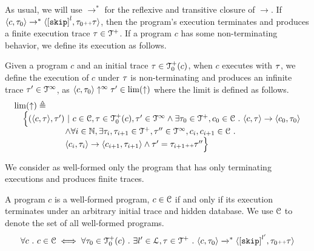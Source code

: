  As usual, we will use $\to^*$ for the reflexive and transitive closure of $\to$. 
 If $\config{c, \trace_0} \rightarrow^{*} \config{\clabel{\eskip}^l, \trace_0 \tracecat \trace}$,
 then the program's execution terminates and produces a finite execution trace $\mathtt{\tau} \in \mathcal{T}^{+}$. 
If a program $c$ has some non-terminating behavior, we define its execution as follows.
\\
\begin{defn}
 \label{def:adaptfun-non-terminating}
 Given a program $c$ and an initial trace $\mathtt{\tau} \in \mathcal{T}^{+}_0(c)$,
 when $c$ executes with $\mathtt{\tau}$, we define the execution of $c$ under $\mathtt{\tau}$ is non-terminating and produces an infinite trace $\mathtt{\tau}' \in \mathcal{T}^{\infty}$, as 
 $\langle c, \mathtt{\tau}_0 \rangle \uparrow^{\infty} \mathtt{\tau}' \in \lim(\uparrow)$
 where the limit is defined as follows.
 \[
 \begin{array}{l}
 \lim(\uparrow) 
 \triangleq 
 \\ \quad
 \Big\{
 (\langle c, \mathtt{\tau} \rangle, \mathtt{\tau}') ~\vert~ 
 c\in \mathcal{C}, \mathtt{\tau} \in \mathcal{T}^{+}_0(c),
 \mathtt{\tau}' \in \mathcal{T}^{\infty}
 \land \exists \mathtt{\tau}_0 \in \mathcal{T}^{+}, c_0 \in \mathcal{C} ~.~ 
 \langle c, \mathtt{\tau} \rangle \to \langle c_0, \mathtt{\tau}_0 \rangle
 \\ \qquad \qquad \qquad 
 \land \forall i \in \mathbb{N}, \exists \mathtt{\tau}_i, \mathtt{\tau}_{i + 1} \in \mathcal{T}^{+}, \mathtt{\tau}'' \in \mathcal{T}^{\infty}, c_i, c_{i + 1} \in \mathcal{C} ~.~ 
 \\ \qquad \qquad \qquad 
 \langle c_i, \mathtt{\tau}_i \rangle \to \langle c_{i + 1}, \mathtt{\tau}_{i + 1} \rangle 
 \land \mathtt{\tau}' = \mathtt{\tau}_{i + 1} {\scriptscriptstyle ++} \mathtt{\tau}''
 \Big\}
 \end{array}
 \]
\end{defn}
We consider as well-formed only the program that has only terminating executions and produces finite traces. 
\begin{defn}
 \label{def:adaptfun-wfprog} 
 A program $c$ is a well-formed program, $c \in \mathcal{C}$ if and only if
 its execution terminates
 under an arbitrary initial trace and hidden database. We use $\mathcal{C}$ to denote the set of all well-formed programs.
 \[
 \forall c \st c \in \cdom \iff 
 \forall \trace_0 \in \ftdom_0(c) \st \exists l' \in \ldom, \trace \in \ftdom
 \st \config{c, \trace_0} \xrightarrow{}^* \config{\clabel{\eskip}^{l'}, \trace_0 \tracecat \trace}
 \]
\end{defn}
